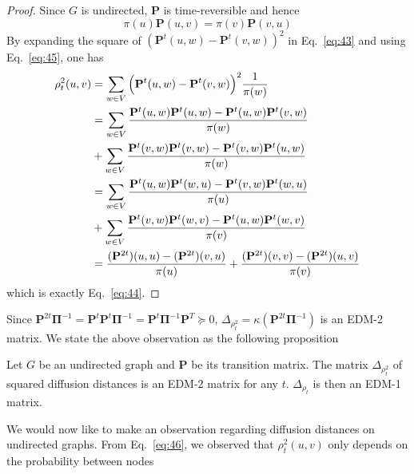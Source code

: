 \begin{proof}
  Since $G$ is undirected, $\mathbf{P}$ is time-reversible and hence
  \begin{equation}
    \label{eq:45}
    \pi(u) \mathbf{P}(u,v) = \pi(v) \mathbf{P}(v,u) 
  \end{equation}
  By
  expanding the square of $(\mathbf{P}^{t}(u,w) - \mathbf{P}^{t}(v,w))^{2}$ in
  Eq.~\eqref{eq:43} and using Eq.~\eqref{eq:45}, one has
  \begin{equation}
    \label{eq:46}
    \begin{split}
      \rho_{t}^{2}(u,v) &= \sum_{w \in V}{\Bigl(\mathbf{P}^{t}(u,w) -
        \mathbf{P}^{t}(v,w)\Bigr)^2 \frac{1}{\pi(w)}} \\
      &= \sum_{w \in V}{\frac{\mathbf{P}^{t}(u,w)\mathbf{P}^{t}(u,w) -
          \mathbf{P}^{t}(u,w)\mathbf{P}^{t}(v,w)}{\pi(w)}} \\
      &+\sum_{w \in V}{\frac{\mathbf{P}^{t}(v,w)\mathbf{P}^{t}(v,w) -
          \mathbf{P}^{t}(v,w)\mathbf{P}^{t}(u,w)}{\pi(w)}} \\
      &= \sum_{w \in
        V}{\frac{\mathbf{P}^{t}(u,w)\mathbf{P}^{t}(w,u) -
          \mathbf{P}^{t}(v,w)\mathbf{P}^{t}(w,u)}{\pi(u)}} \\ &+
      \sum_{w \in V}{\frac{\mathbf{P}^{t}(v,w)\mathbf{P}^{t}(w,v)
          -
          \mathbf{P}^{t}(u,w)\mathbf{P}^{t}(w,v)}{\pi(v)}} \\
      &= \frac{(\mathbf{P}^{2t})(u,u) -
        (\mathbf{P}^{2t})(v,u)}{\pi(u)} +
      \frac{(\mathbf{P}^{2t})(v,v) -
        (\mathbf{P}^{2t})(u,v)}{\pi(v)} 
    \end{split} 
  \end{equation}
  which is exactly Eq.~\eqref{eq:44}. 
\end{proof} 
Since $\mathbf{P}^{2t}\bm{\Pi}^{-1} =
\mathbf{P}^{t}\mathbf{P}^{t}\bm{\Pi}^{-1} =
\mathbf{P}^{t}\bm{\Pi}^{-1}\mathbf{P}^{T} \succeq 0$,
$\Delta_{\rho_{t}^2} = \kappa(\mathbf{P}^{2t}\bm{\Pi}^{-1})$ is an
EDM-2 matrix. We state the above observation as the following
proposition
\begin{proposition} 
\label{prop:14} 
Let $G$ be an undirected graph and $\mathbf{P}$ be its transition
matrix. The matrix $\Delta_{\rho_{t}^2}$ of squared diffusion distances is 
an EDM-2 matrix for any $t$. $\Delta_{\rho_t}$ is then an EDM-1 matrix.
\end{proposition}
%
We would now like to make an observation regarding diffusion distances
on undirected graphs. From Eq.~\eqref{eq:46}, we observed that
$\rho_{t}^{2}(u,v)$ only depends on the probability between nodes
